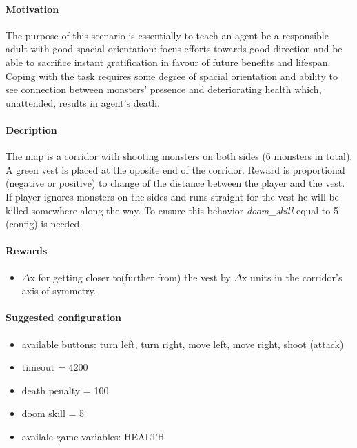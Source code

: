 		\paragraph{Motivation} 
			The purpose of this scenario is essentially to teach an agent be a responsible adult with good spacial orientation: focus efforts towards good direction and be able to sacrifice instant gratification in favour of future benefits and lifespan. Coping with the task requires some degree of spacial orientation and ability to see connection between monsters' presence and deteriorating health which, unattended, results in agent's death.

		\paragraph{Decription}
			The map is a corridor with shooting monsters on both sides (6 monsters in total). A green vest is placed at the oposite end of the corridor. Reward is proportional (negative or positive) to change of the distance between the player and the vest. If player ignores monsters on the sides and runs straight for the vest he will be killed somewhere along the way. To ensure this behavior \textit{doom\_skill} equal to 5 (config) is needed.

		\paragraph{Rewards}
			\begin{itemize}
				\item $\Delta$x for getting closer to(further from) the vest by $\Delta$x units in the corridor's axis of symmetry.
			\end{itemize}
			
		\paragraph{Suggested configuration}
			\begin{itemize}
				\item available buttons: turn left, turn right, move left, move right, shoot (attack)
				\item timeout = 4200
				\item death penalty = 100
				\item doom skill = 5
				\item availale game variables: HEALTH
			\end{itemize}
	\newpage

